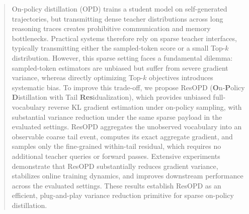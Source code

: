 \begin{abstract}
On-policy distillation (OPD) trains a student model on self-generated trajectories, but transmitting dense teacher distributions across long reasoning traces creates prohibitive communication and memory bottlenecks. Practical systems therefore rely on sparse teacher interfaces, typically transmitting either the sampled-token score or a small Top-$k$ distribution. However, this sparse setting faces a fundamental dilemma: sampled-token estimators are unbiased but suffer from severe gradient variance, whereas directly optimizing Top-$k$ objectives introduces systematic bias. To improve this trade-off, we propose ResOPD (\textbf{O}n-\textbf{P}olicy \textbf{D}istillation with Tail \textbf{Res}idualization), which provides unbiased full-vocabulary reverse KL gradient estimation under on-policy sampling, with substantial variance reduction under the same sparse payload in the evaluated settings. ResOPD aggregates the unobserved vocabulary into an observable coarse tail event, computes its exact aggregate gradient, and samples only the fine-grained within-tail residual, which requires no additional teacher queries or forward passes. Extensive experiments demonstrate that ResOPD substantially reduces gradient variance, stabilizes online training dynamics, and improves downstream performance across the evaluated settings. These results establish ResOPD as an efficient, plug-and-play variance reduction primitive for sparse on-policy distillation.
\end{abstract}